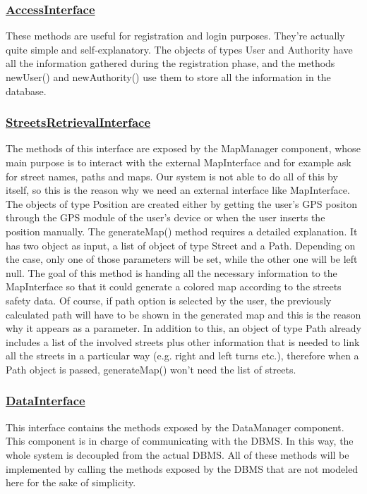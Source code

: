 		\subsubsection[AccessInterface]{\hyperlink{toc}{AccessInterface}}
			These methods are useful for registration and login purposes. They're actually quite simple and self-explanatory. The objects of types User and Authority have all the information gathered during the registration phase, and the methods newUser() and newAuthority() use them to store all the information in the database.
		
		\subsubsection[StreetsRetrievalInterface]{\hyperlink{toc}{StreetsRetrievalInterface}}
			The methods of this interface are exposed by the MapManager component, whose main purpose is to interact with the external MapInterface and for example ask for street names, paths and maps. Our system is not able to do all of this by itself, so this is the reason why we need an external interface like MapInterface. The objects of type Position are created either by getting the user's GPS positon through the GPS module of the user's device or when the user inserts the position manually. The generateMap() method requires a detailed explanation. It has two object as input, a list of object of type Street and a Path. Depending on the case, only one of those parameters will be set, while the other one will be left null. The goal of this method is handing all the necessary information to the MapInterface so that it could generate a colored map according to the streets safety data. Of course, if path option is selected by the user, the previously calculated path will have to be shown in the generated map and this is the reason why it appears as a parameter. In addition to this, an object of type Path already includes a list of the involved streets plus other information that is needed to link all the streets in a particular way (e.g. right and left turns etc.), therefore when a Path object is passed, generateMap() won't need the list of streets.
		
		\subsubsection[DataInterface]{\hyperlink{toc}{DataInterface}}
			This interface contains the methods exposed by the DataManager component. This component is in charge of communicating with the DBMS. In this way, the whole system is decoupled from the actual DBMS. All of these methods will be implemented by calling the methods exposed by the DBMS that are not modeled here for the sake of simplicity.
		
